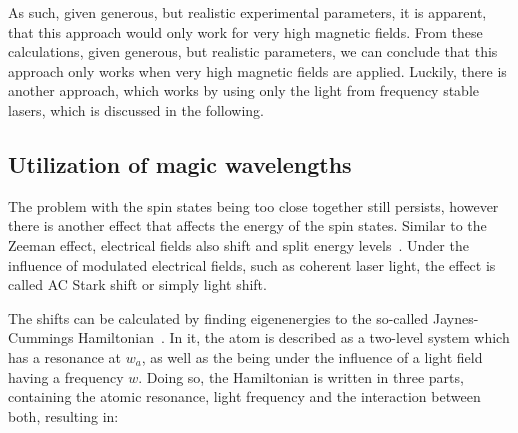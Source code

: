 As such, given generous, but realistic experimental parameters, it is apparent, that this approach would only work for very high magnetic fields.
From these calculations, given generous, but realistic parameters, we can conclude that this approach only works when very high magnetic fields are applied. Luckily, there is another approach, which works by using only the light from frequency stable lasers, which is discussed in the following.

\begin{figure}[t]%
\label{fig:pot_separation}
\end{figure}

\subsection{Utilization of magic wavelengths}

The problem with the spin states being too close together still persists, however there is another effect that affects the energy of the spin states. Similar to the Zeeman effect, electrical fields also shift and split energy levels~\cite{Voigt, Courtney1995}. Under the influence of modulated electrical fields, such as coherent laser light, the effect is called AC Stark shift or simply light shift.

The shifts can be calculated by finding eigenenergies to the so-called Jaynes-Cummings Hamiltonian~\cite{Fox2006}. In it, the atom is described as a two-level system which has a resonance at $w_a$, as well as the being under the influence of a light field having a frequency $w$. Doing so, the Hamiltonian is written in three parts, containing the atomic resonance, light frequency and the interaction between both, resulting in:

